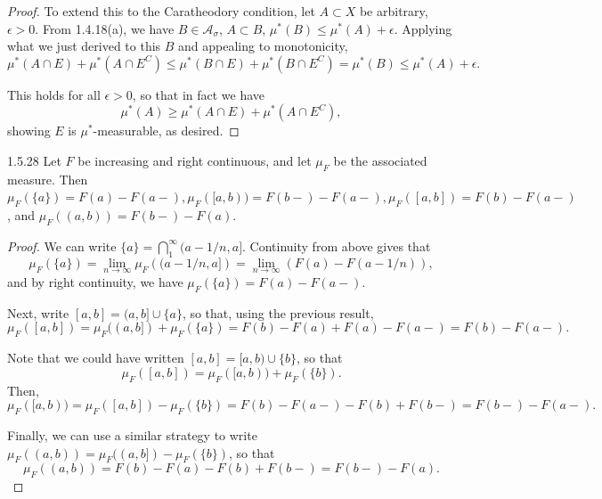 \documentclass[11pt]{article}
\begin{document}
\begin{proof}
To extend this to the Caratheodory condition, let \( A \subset X \) be arbitrary, \(\epsilon > 0\).
From 1.4.18(a), we have \( B \in \mathcal{A}_{\sigma} \), \( A \subset B \), \( \mu^{*}(B) \leq \mu^{*}(A) + \epsilon \).
Applying what we just derived to this \( B \) and appealing to monotonicity,
\begin{equation}
\label{eq:24}
\mu^{*}(A \cap E) + \mu^{*}(A \cap E^C) \leq \mu^{*}(B \cap E) + \mu^{*}(B \cap E^C) = \mu^{*}(B) \leq \mu^{*}(A) + \epsilon.
\end{equation}

This holds for all \(\epsilon > 0\), so that in fact we have
\begin{equation}
\label{eq:25}
\mu^{*}(A) \geq \mu^{*}(A \cap E) + \mu^{*}(A \cap E^C),
\end{equation}
showing \( E \) is \( \mu^{*} \)-measurable, as desired.
\end{proof}

\begin{problem}{1.5.28}
	Let \( F \) be increasing and right continuous, and let \(\mu_F\) be the associated measure.
	Then \(\mu_F(\{a\})=F(a)-F(a-), \mu_F([a,b))= F(b-)-F(a-), \mu_F([a,b])=F(b)-F(a-)\), and \( \mu_F((a,b)) = F(b-) - F(a) \).
\end{problem}
\begin{proof}
	We can write \( \{a\} = \bigcap_1^{\infty} (a-1/n, a] \).
	Continuity from above gives that
	\begin{equation}
		\label{eq:14}
		\mu_F(\{a\}) = \lim_{n\rightarrow\infty} \mu_F\left( (a-1/n,a] \right) = \lim_{n\rightarrow\infty} \left( F(a) - F(a-1/n) \right),
	\end{equation}
	and by right continuity, we have \( \mu_F(\{a\}) = F(a) - F(a-) \).

	Next, write \( [a,b] = (a,b] \cup \{a\} \), so that, using the previous result,
	\begin{equation}
		\label{eq:15}
		\mu_F([a,b]) = \mu_F((a,b]) + \mu_F(\{a\}) = F(b) - F(a) + F(a) - F(a-) = F(b) - F(a-).
	\end{equation}

	Note that we could have written \( [a,b] = [a,b) \cup \{b\} \), so that
	\begin{equation}
		\label{eq:16}
		\mu_F([a,b]) = \mu_F([a,b)) + \mu_F(\{b\}).
	\end{equation}
	Then,
	\begin{equation}
		\label{eq:17}
		\mu_F([a,b)) = \mu_F([a,b]) - \mu_F(\{b\}) = F(b) - F(a-) - F(b) + F(b-) = F(b-) - F(a-).
	\end{equation}

	Finally, we can use a similar strategy to write \( \mu_F((a,b)) = \mu_F((a,b]) - \mu_F(\{b\}) \), so that
	\begin{equation}
		\label{eq:18}
		\mu_F((a,b)) = F(b) - F(a) - F(b) + F(b-) = F(b-) - F(a).
	\end{equation}
\end{proof}
\end{document}
